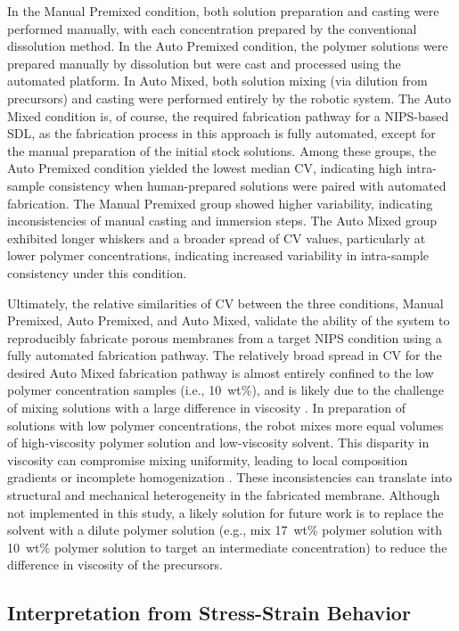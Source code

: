 \documentclass[preprint,12pt,times]{elsarticle}
\begin{document}
In the Manual Premixed condition, both solution preparation and casting were performed manually, with each concentration prepared by the conventional dissolution method. In the Auto Premixed condition, the polymer solutions were prepared manually by dissolution but were cast and processed using the automated platform. In Auto Mixed, both solution mixing (via dilution from precursors) and casting were performed entirely by the robotic system. The Auto Mixed condition is, of course, the required fabrication pathway for a NIPS-based SDL, as the fabrication process in this approach is fully automated, except for the manual preparation of the initial stock solutions. Among these groups, the Auto Premixed condition yielded the lowest median CV, indicating high intra-sample consistency when human-prepared solutions were paired with automated fabrication. The Manual Premixed group showed higher variability, indicating inconsistencies of manual casting and immersion steps. The Auto Mixed group exhibited longer whiskers and a broader spread of CV values, particularly at lower polymer concentrations, indicating increased variability in intra-sample consistency under this condition. 

Ultimately, the relative similarities of CV between the three conditions, Manual Premixed, Auto Premixed, and Auto Mixed, validate the ability of the system to reproducibly fabricate porous membranes from a target NIPS condition using a fully automated fabrication pathway. The relatively broad spread in CV for the desired Auto Mixed fabrication pathway is almost entirely confined to the low polymer concentration samples (i.e., 10~wt\%), and is likely due to the challenge of mixing solutions with a large difference in viscosity \cite{Mcdermott2023}. In preparation of solutions with low polymer concentrations, the robot mixes more equal volumes of high-viscosity polymer solution and low-viscosity solvent. This disparity in viscosity can compromise mixing uniformity, leading to local composition gradients or incomplete homogenization \cite{Mcdermott2023}. These inconsistencies can translate into structural and mechanical heterogeneity in the fabricated membrane. Although not implemented in this study, a likely solution for future work is to replace the solvent with a dilute polymer solution (e.g., mix 17~wt\% polymer solution with 10~wt\% polymer solution to target an intermediate concentration) to reduce the difference in viscosity of the precursors. 


\subsection{Interpretation from Stress-Strain Behavior}
\end{document}
